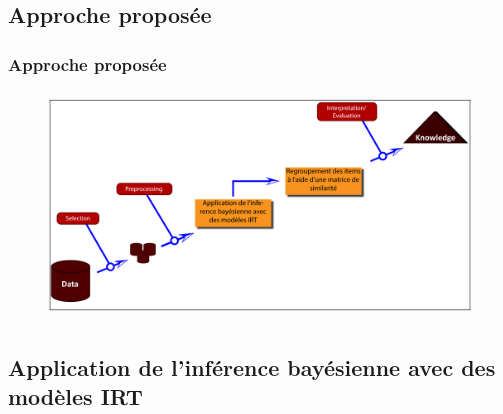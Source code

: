 \documentclass[aspectratio=169,professionalfonts, 12pt]{beamer}
\begin{document}
\subsection{Approche proposée}

\begin{frame}
  \frametitle{Approche proposée}
  \justifying 
  \begin{minipage}{\textwidth}
  \begin{figure}[H]
      \includegraphics[height=6cm]{images/contribution/approch.png}
  \end{figure}
  \end{minipage}
\end{frame}

\subsection{Application de l'inférence bayésienne avec des modèles IRT}
\end{document}
